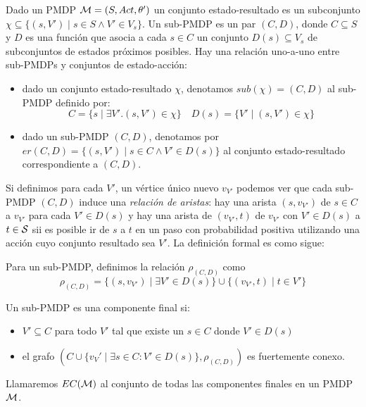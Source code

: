 \begin{definition}
	Dado un PMDP $\mathcal{M} = (S, Act, \theta')$ un conjunto estado-resultado es un subconjunto $\chi \subseteq \{(s, V') \mid s \in S \wedge V' \in V_s\}$. Un sub-PMDP es un par $(C, D)$, donde $C \subseteq S$ y $D$ es una función que asocia a cada $s \in C$ un conjunto $D(s) \subseteq V_s$ de subconjuntos de estados próximos posibles. Hay una relación uno-a-uno entre sub-PMDPs y conjuntos de estado-acción:

	\begin{itemize}
		\item dado un conjunto estado-resultado $\chi$, denotamos $sub(\chi) = (C, D)$ al
		      sub-PMDP definido por:
		      \[
			      C = \{s \mid \exists V' . (s, V') \in \chi\} \quad D(s) = \{V' \mid (s, V') \in \chi\}
		      \]

		\item dado un sub-PMDP $(C, D)$, denotamos por $er(C,D) = \{(s,V') \mid s \in C
			      \wedge V' \in D(s)\}$ al conjunto estado-resultado correspondiente a $(C, D)$.
	\end{itemize}
\end{definition}

Si definimos para cada $V'$, un vértice único nuevo $v_{V'}$ podemos ver que
cada sub-PMDP $(C, D)$ induce una \textit{relación de aristas}: hay una arista
$(s, v_{V'})$ de $s \in C$ a $v_{V'}$ para cada $V' \in D(s)$ y hay una arista
de $(v_{V'}, t)$ de $v_{V'}$ con $V' \in D(s)$ a $t \in \mathcal{S}$ sii es posible ir
de $s$ a $t$ en un paso con probabilidad positiva utilizando una acción cuyo
conjunto resultado sea $V'$. La definición formal es como sigue:

\begin{definition}
	Para un sub-PMDP, definimos la relación $\rho_{(C,D)}$ como
	\[
		\rho_{(C,D)} = \{(s, v_{V'}) \mid \exists V' \in D(s)\} \cup \{(v_{V'}, t) \mid t \in V' \}
	\]
\end{definition}

\begin{definition} \label{defEC}
	Un sub-PMDP es una componente final si:

	\begin{itemize}
		\item $V' \subseteq C$ para todo $V'$ tal que existe un $s \in C$ donde $V' \in D(s)$

		\item el grafo $(C \cup \{v_V' \mid \exists s \in C : V' \in D(s)\}, \rho_{(C,D)})$
		      es fuertemente conexo.
	\end{itemize}

	Llamaremos $EC(\mathcal{M})$ al conjunto de todas las componentes finales en un PMDP
	$\mathcal{M}$.
\end{definition}

